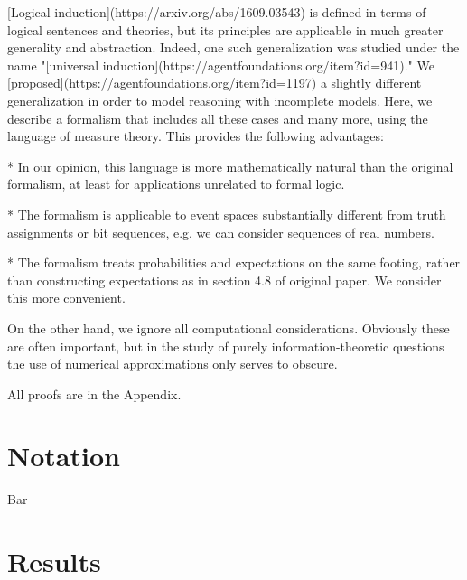 \documentclass[a4paper]{article}
\begin{document}
[Logical induction](https://arxiv.org/abs/1609.03543) is defined in terms of logical sentences and theories, but its principles are applicable in much greater generality and abstraction. Indeed, one such generalization was studied under the name "[universal induction](https://agentfoundations.org/item?id=941)." We [proposed](https://agentfoundations.org/item?id=1197) a slightly different generalization in order to model reasoning with incomplete models. Here, we describe a formalism that includes all these cases and many more, using the language of measure theory. This provides the following advantages:

* In our opinion, this language is more mathematically natural than the original formalism, at least for applications unrelated to formal logic.

* The formalism is applicable to event spaces substantially different from truth assignments or bit sequences, e.g. we can consider sequences of real numbers.

* The formalism treats probabilities and expectations on the same footing, rather than constructing expectations as in section 4.8 of original paper. We consider this more convenient.

On the other hand, we ignore all computational considerations. Obviously these are often important, but in the study of purely information-theoretic questions the use of numerical approximations only serves to obscure.

All proofs are in the Appendix.

\section{Notation}

Bar

\section{Results}
\end{document}
